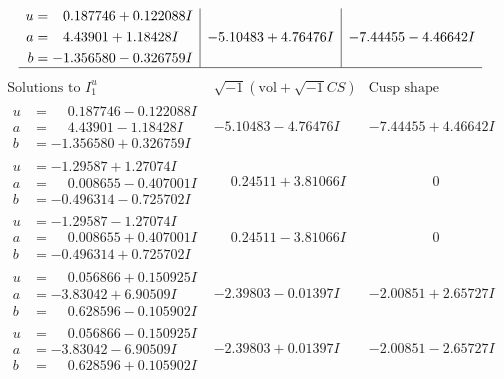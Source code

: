 \documentclass[1p]{elsarticle_modified}
\theoremstyle{definition}
\newcommand{\I}{\sqrt{-1}}
\begin{document}
$$\begin{array}{c|c|c}
\begin{aligned}
u &= \phantom{-}0.187746 + 0.122088 I \\
a &= \phantom{-}4.43901 + 1.18428 I \\
b &= -1.356580 - 0.326759 I\end{aligned}
 & -5.10483 + 4.76476 I & -7.44455 - 4.46642 I\\
 \hline 
 \end{array}$$\newpage$$\begin{array}{c|c|c}  
\text{Solutions to }I^u_{1}& \I (\text{vol} + \sqrt{-1}CS) & \text{Cusp shape}\\
 \hline 
\begin{aligned}
u &= \phantom{-}0.187746 - 0.122088 I \\
a &= \phantom{-}4.43901 - 1.18428 I \\
b &= -1.356580 + 0.326759 I\end{aligned}
 & -5.10483 - 4.76476 I & -7.44455 + 4.46642 I \\ \hline\begin{aligned}
u &= -1.29587 + 1.27074 I \\
a &= \phantom{-}0.008655 - 0.407001 I \\
b &= -0.496314 - 0.725702 I\end{aligned}
 & \phantom{-}0.24511 + 3.81066 I & \phantom{-0.000000 } 0 \\ \hline\begin{aligned}
u &= -1.29587 - 1.27074 I \\
a &= \phantom{-}0.008655 + 0.407001 I \\
b &= -0.496314 + 0.725702 I\end{aligned}
 & \phantom{-}0.24511 - 3.81066 I & \phantom{-0.000000 } 0 \\ \hline\begin{aligned}
u &= \phantom{-}0.056866 + 0.150925 I \\
a &= -3.83042 + 6.90509 I \\
b &= \phantom{-}0.628596 - 0.105902 I\end{aligned}
 & -2.39803 - 0.01397 I & -2.00851 + 2.65727 I \\ \hline\begin{aligned}
u &= \phantom{-}0.056866 - 0.150925 I \\
a &= -3.83042 - 6.90509 I \\
b &= \phantom{-}0.628596 + 0.105902 I\end{aligned}
 & -2.39803 + 0.01397 I & -2.00851 - 2.65727 I \\ \hline\begin{aligned}

\end{aligned}
\end{array}$$
\end{document}
